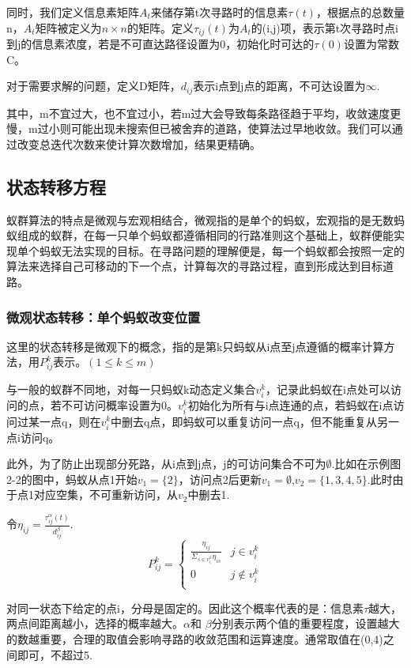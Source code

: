 \documentclass[12pt]{article}
\begin{document}
同时，我们定义信息素矩阵$A_{t}$来储存第t次寻路时的信息素$\tau(t)$，根据点的总数量n，$A_{t}$矩阵被定义为$n\times n$的矩阵。定义$\tau_{i j}(t)$为$A_{t}$的(i,j)项，表示第t次寻路时点i到j的信息素浓度，若是不可直达路径设置为0，初始化时可达的$\tau(0)$设置为常数C。

对于需要求解的问题，定义D矩阵，$d_{ij}$表示i点到j点的距离，不可达设置为$\infty$.

其中，m不宜过大，也不宜过小，若m过大会导致每条路径趋于平均，收敛速度更慢，m过小则可能出现未搜索但已被舍弃的道路，使算法过早地收敛。我们可以通过改变总迭代次数来使计算次数增加，结果更精确。
\subsection{状态转移方程}
蚁群算法的特点是微观与宏观相结合，微观指的是单个的蚂蚁，宏观指的是无数蚂蚁组成的蚁群，在每一只单个蚂蚁都遵循相同的行路准则这个基础上，蚁群便能实现单个蚂蚁无法实现的目标。在寻路问题的理解便是，每一个蚂蚁都会按照一定的算法来选择自己可移动的下一个点，计算每次的寻路过程，直到形成达到目标道路。
\subsubsection{微观状态转移：单个蚂蚁改变位置}
这里的状态转移是微观下的概念，指的是第k只蚂蚁从i点至j点遵循的概率计算方法，用$P_{i j}^k$表示。$(1\le k\le m)$

与一般的蚁群不同地，对每一只蚂蚁k动态定义集合$v_{i}^{k}$，记录此蚂蚁在i点处可以访问的点，若不可访问概率设置为0。$v_{i}^{k}$初始化为所有与i点连通的点，若蚂蚁在i点访问过某一点q，则在$v_{i}^{k}$中删去q点，即蚂蚁可以重复访问一点q，但不能重复从另一点i访问q。

此外，为了防止出现部分死路，从i点到j点，j的可访问集合不可为$\emptyset$.比如在示例图2-2的图中，蚂蚁从点1开始$v_{1}=\{2\}$，访问点2后更新$v_{1}=\emptyset$,$v_{2}=\{1,3,4,5\}$.此时由于点1对应空集，不可重新访问，从$v_{2}$中删去1.

令$\eta_{ij} =\frac{ \tau_{ij}^{\alpha}(t)}{d_{ij}^{\beta}}$.
\[P_{ij}^{k}=\begin{cases}
	\frac{\eta_{ij}}{\Sigma_{s\in v_{i}^{k}}\eta_{is}} & j \in v_{i}^{k}\\
	0 & j \notin v_{i}^{k}\\
\end{cases}
\]

对同一状态下给定的点i，分母是固定的。因此这个概率代表的是：信息素$\tau$越大，两点间距离越小，选择的概率越大。$\alpha$和 $\beta$分别表示两个值的重要程度，设置越大的数越重要，合理的取值会影响寻路的收敛范围和运算速度。通常取值在(0,4)之间即可，不超过5.
\end{document}
